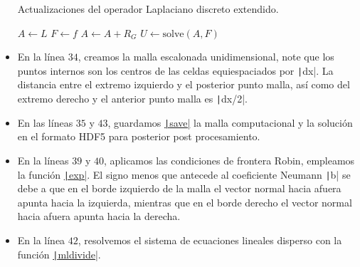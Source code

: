 \begin{problem}
\begin{itemize}
        \begin{algorithm}[H]
          \caption{Actualizaciones del operador Laplaciano discreto extendido.}\label{algo:updateL}
          $A\leftarrow L$\;
          $F\leftarrow f$\;
          $A\leftarrow A+R_{G}$\;
          $U\leftarrow \text{solve}\left(A, F\right)$\;
        \end{algorithm}

  \item

        En la línea $34$, creamos la malla escalonada
        unidimensional, note que los puntos internos son los
        centros de las celdas equiespaciados por
        \texttt|dx|.
        La distancia entre el extremo izquierdo y el posterior
        punto malla, así como del extremo derecho y el anterior
        punto malla es \texttt|dx/2|.

  \item

        En las líneas $35$ y $43$, guardamos
        \href{https://docs.octave.org/latest/Simple-File-I_002fO.html#index-save-6}{\texttt|save|}
        la malla computacional y la solución en el formato HDF5
        para posterior post procesamiento.

  \item

        En la líneas $39$ y $40$, aplicamos las condiciones de
        frontera Robin, empleamos la función
        \href{https://docs.octave.org/latest/Exponents-and-Logarithms.html#XREFexp}{\texttt|exp|}.
        El signo menos que antecede al coeficiente Neumann
        \texttt|b| se debe a que en el borde izquierdo
        de la malla el vector normal hacia afuera apunta hacia la
        izquierda, mientras que en el borde derecho el vector
        normal hacia afuera apunta hacia la derecha.

  \item

        En la línea $42$, resolvemos el sistema de ecuaciones lineales
        disperso con la función \href{https://docs.octave.org/latest/Arithmetic-Ops.html#index-mldivide}{\texttt|mldivide|}.


\end{itemize}
\end{problem}
